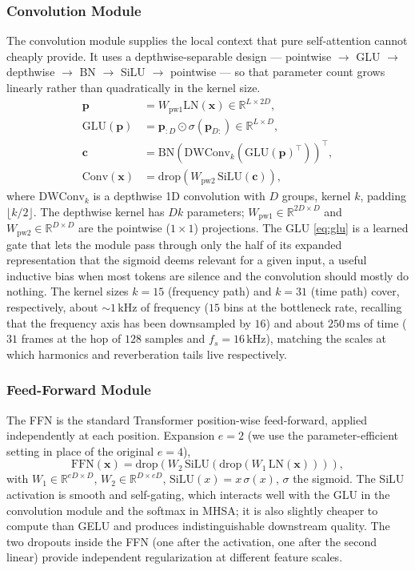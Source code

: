 \documentclass[journal,10pt]{IEEEtran}
\newcommand{\R}{\mathbb{R}}
\newcommand{\bx}{\mathbf{x}}
\newcommand{\bp}{\mathbf{p}}
\newcommand{\bc}{\mathbf{c}}
\newcommand{\BN}{\mathrm{BN}}
\newcommand{\LN}{\mathrm{LN}}
\newcommand{\GLU}{\mathrm{GLU}}
\newcommand{\SiLU}{\mathrm{SiLU}}
\begin{document}
\subsubsection{Convolution Module}
The convolution module supplies the local context that pure self-attention cannot cheaply provide. It uses a depthwise-separable design --- pointwise \(\to\) GLU \(\to\) depthwise \(\to\) BN \(\to\) SiLU \(\to\) pointwise --- so that parameter count grows linearly rather than quadratically in the kernel size.
\begin{align}
\bp&=W_{\mathrm{pw1}}\LN(\bx)\in\R^{L\times 2D},\\
\GLU(\bp)&=\bp_{:D}\odot\sigma(\bp_{D:})\in\R^{L\times D},\label{eq:glu}\\
\bc&=\BN(\mathrm{DWConv}_k(\GLU(\bp)^\top))^\top,\\
\mathrm{Conv}(\bx)&=\mathrm{drop}\!\left(W_{\mathrm{pw2}}\,\SiLU(\bc)\right)\!,
\end{align}
where \(\mathrm{DWConv}_k\) is a depthwise 1D convolution with \(D\) groups, kernel \(k\), padding \(\lfloor k/2\rfloor\). The depthwise kernel has \(Dk\) parameters; \(W_{\mathrm{pw1}}\!\in\!\R^{2D\times D}\) and \(W_{\mathrm{pw2}}\!\in\!\R^{D\times D}\) are the pointwise (\(1\!\times\!1\)) projections. The GLU \eqref{eq:glu} is a learned gate that lets the module pass through only the half of its expanded representation that the sigmoid deems relevant for a given input, a useful inductive bias when most tokens are silence and the convolution should mostly do nothing. The kernel sizes \(k=15\) (frequency path) and \(k=31\) (time path) cover, respectively, about \(\sim\!1\,\mathrm{kHz}\) of frequency (\(15\) bins at the bottleneck rate, recalling that the frequency axis has been downsampled by \(16\)) and about \(250\,\mathrm{ms}\) of time (\(31\) frames at the hop of \(128\) samples and \(f_s=16\,\mathrm{kHz}\)), matching the scales at which harmonics and reverberation tails live respectively.

\subsubsection{Feed-Forward Module}
The FFN is the standard Transformer position-wise feed-forward, applied independently at each position. Expansion \(e=2\) (we use the parameter-efficient setting in place of the original \(e=4\)),
\begin{equation}
\mathrm{FFN}(\bx)=\mathrm{drop}\!\left(W_2\,\SiLU(\mathrm{drop}(W_1\,\LN(\bx)))\right)\!,
\label{eq:ffn}
\end{equation}
with \(W_1\in\R^{eD\times D}\), \(W_2\in\R^{D\times eD}\), \(\SiLU(x)=x\,\sigma(x)\), \(\sigma\) the sigmoid. The SiLU activation is smooth and self-gating, which interacts well with the GLU in the convolution module and the softmax in MHSA; it is also slightly cheaper to compute than GELU and produces indistinguishable downstream quality. The two dropouts inside the FFN (one after the activation, one after the second linear) provide independent regularization at different feature scales.
\end{document}
